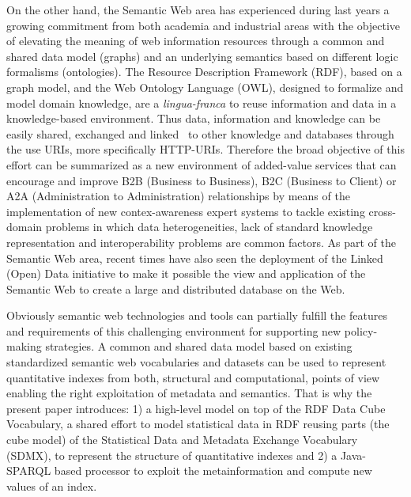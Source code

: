 \documentclass{llncs}
\begin{document}
On the other hand, the Semantic Web area has experienced during last years a growing commitment from both academia and industrial areas 
with the objective of elevating the meaning of web information resources through a common and shared data model (graphs) and 
an underlying semantics based on different logic formalisms (ontologies). The Resource Description Framework (RDF), based on a graph model, 
and the Web Ontology Language (OWL), designed to formalize and model domain knowledge, are a \textit{lingua-franca} to reuse information 
and data in a knowledge-based environment. Thus data, information and knowledge can be easily shared, exchanged and linked~\cite{Maali_Cyganiak_2011} 
to other knowledge and databases through the use URIs, more specifically HTTP-URIs. Therefore the broad objective of this effort can 
be summarized as a new environment of added-value services that can encourage and improve B2B (Business to Business), B2C (Business to Client) or 
A2A (Administration to Administration) relationships by means of the implementation of new contex-awareness expert systems 
to tackle existing cross-domain problems in which data heterogeneities, lack of standard knowledge representation and 
interoperability problems are common factors. As part of the Semantic Web area, recent times have also seen the deployment of 
the Linked (Open) Data initiative  to make it possible the view and application of the Semantic Web to create a large 
and distributed database on the Web. 

Obviously semantic web technologies and tools can partially fulfill the features and requirements of this challenging environment for supporting 
new policy-making strategies. A common and shared data model based on existing standardized semantic web vocabularies and datasets can be used to 
represent quantitative indexes from both, structural and computational, points of view enabling the right exploitation of metadata and semantics. 
That is why the present paper introduces: 1) a high-level model on top of the RDF Data Cube Vocabulary, a shared effort to model statistical data in RDF reusing parts 
(the cube model) of the Statistical Data and Metadata Exchange Vocabulary (SDMX), to represent the structure of quantitative indexes and 
2) a Java-SPARQL based processor to exploit the metainformation and compute new values of an index.
\end{document}
